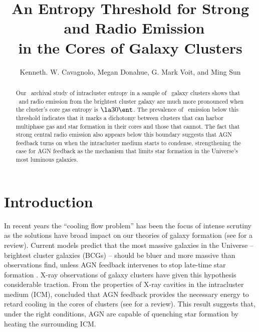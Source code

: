 \documentclass{emulateapj}
\begin{document}
\title{An Entropy Threshold for Strong \halpha\ and Radio Emission\\in the Cores of Galaxy Clusters}
\author{
  Kenneth. W. Cavagnolo,
  Megan Donahue,
  G. Mark Voit,
  and Ming Sun}


\begin{abstract}
  Our \Chandra\ archival study of intracluster entropy in a sample of
  \clnum\ galaxy clusters shows that \halpha\ and radio emission from
  the brightest cluster galaxy are much more pronounced when the
  cluster's core gas entropy is $\la 30 \ent$. The prevalence of
  \halpha\ emission below this threshold indicates that it marks a
  dichotomy between clusters that can harbor multiphase gas and star
  formation in their cores and those that cannot. The fact that strong
  central radio emission also appears below this boundary suggests
  that AGN feedback turns on when the intracluster medium starts to
  condense, strengthening the case for AGN feedback as the mechanism
  that limits star formation in the Universe's most luminous galaxies.
\end{abstract}


\section{Introduction}
\label{sec:intro}

In recent years the ``cooling flow problem'' has been the focus of
intense scrutiny as the solutions have broad impact on our theories of
galaxy formation (see \cite{cfreview} for a review). Current models
predict that the most massive galaxies in the Universe -- brightest
cluster galaxies (BCGs) -- should be bluer and more massive than
observations find, unless AGN feedback intervenes to stop late-time
star formation \citep{bower06, croton06, saro06}. X-ray observations
of galaxy clusters have given this hypothesis considerable
traction. From the properties of X-ray cavities in the intracluster
medium (ICM), \cite{birzan04} concluded that AGN feedback provides the
necessary energy to retard cooling in the cores of clusters (see
\citealt{mcnamrev} for a review). This result suggests that, under the
right conditions, AGN are capable of quenching star formation by
heating the surrounding ICM.
\end{document}
